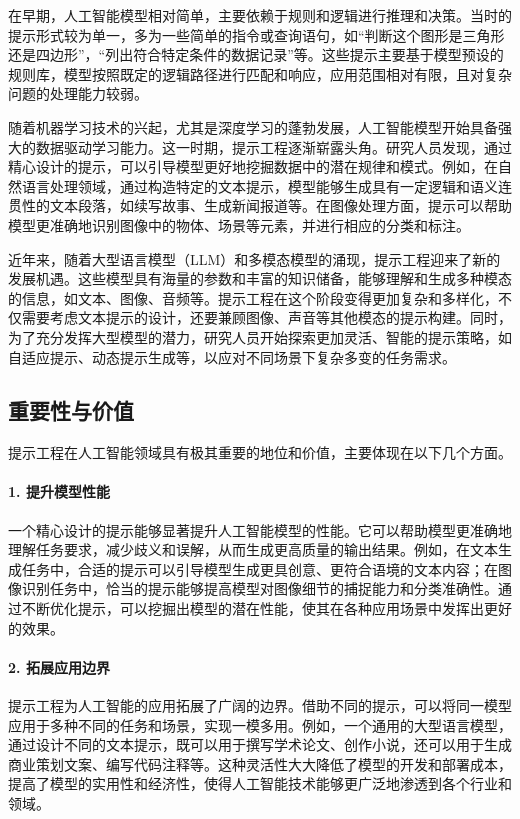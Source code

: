 在早期，人工智能模型相对简单，主要依赖于规则和逻辑进行推理和决策。当时的提示形式较为单一，多为一些简单的指令或查询语句，如“判断这个图形是三角形还是四边形”，“列出符合特定条件的数据记录”等。这些提示主要基于模型预设的规则库，模型按照既定的逻辑路径进行匹配和响应，应用范围相对有限，且对复杂问题的处理能力较弱。

随着机器学习技术的兴起，尤其是深度学习的蓬勃发展，人工智能模型开始具备强大的数据驱动学习能力。这一时期，提示工程逐渐崭露头角。研究人员发现，通过精心设计的提示，可以引导模型更好地挖掘数据中的潜在规律和模式。例如，在自然语言处理领域，通过构造特定的文本提示，模型能够生成具有一定逻辑和语义连贯性的文本段落，如续写故事、生成新闻报道等。在图像处理方面，提示可以帮助模型更准确地识别图像中的物体、场景等元素，并进行相应的分类和标注。

近年来，随着大型语言模型（LLM）和多模态模型的涌现，提示工程迎来了新的发展机遇。这些模型具有海量的参数和丰富的知识储备，能够理解和生成多种模态的信息，如文本、图像、音频等。提示工程在这个阶段变得更加复杂和多样化，不仅需要考虑文本提示的设计，还要兼顾图像、声音等其他模态的提示构建。同时，为了充分发挥大型模型的潜力，研究人员开始探索更加灵活、智能的提示策略，如自适应提示、动态提示生成等，以应对不同场景下复杂多变的任务需求。

\subsection{重要性与价值}

提示工程在人工智能领域具有极其重要的地位和价值，主要体现在以下几个方面。

\paragraph{1. 提升模型性能}

一个精心设计的提示能够显著提升人工智能模型的性能。它可以帮助模型更准确地理解任务要求，减少歧义和误解，从而生成更高质量的输出结果。例如，在文本生成任务中，合适的提示可以引导模型生成更具创意、更符合语境的文本内容；在图像识别任务中，恰当的提示能够提高模型对图像细节的捕捉能力和分类准确性。通过不断优化提示，可以挖掘出模型的潜在性能，使其在各种应用场景中发挥出更好的效果。

\paragraph{2. 拓展应用边界}

提示工程为人工智能的应用拓展了广阔的边界。借助不同的提示，可以将同一模型应用于多种不同的任务和场景，实现一模多用。例如，一个通用的大型语言模型，通过设计不同的文本提示，既可以用于撰写学术论文、创作小说，还可以用于生成商业策划文案、编写代码注释等。这种灵活性大大降低了模型的开发和部署成本，提高了模型的实用性和经济性，使得人工智能技术能够更广泛地渗透到各个行业和领域。

